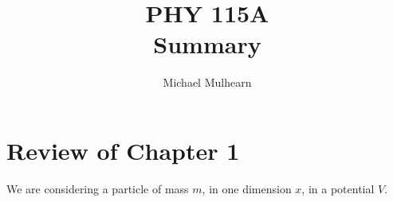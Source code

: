 \documentclass[12pt]{article}
\begin{document}
\newcommand{\ihbar}{\ensuremath{i \hbar}}
\newcommand{\Pss}{\ensuremath{\Psi^*}}
\newcommand{\dPsidt}{\ensuremath{ \frac{\partial \Psi}{\partial t} }}
\newcommand{\dPsidx}{\ensuremath{ \frac{\partial \Psi}{\partial x} }}
\newcommand{\ddPsidx}{\ensuremath{ \frac{\partial^2 \Psi}{\partial x^2} }}
\newcommand{\dPssdt}{\ensuremath{ \frac{\partial \Psi^*}{\partial t} }}
\newcommand{\dPssdx}{\ensuremath{ \frac{\partial \Psi^*}{\partial x} }}
\newcommand{\ddPssdx}{\ensuremath{ \frac{\partial^2 \Psi^*}{\partial x^2} }}

\newcommand{\dphidt}{\ensuremath{ \frac{d \phi}{dt} }}
\newcommand{\dpsidx}{\ensuremath{ \frac{d \psi}{dx} }}
\newcommand{\ddpsidx}{\ensuremath{ \frac{d^2 \psi}{dx^2} }}


\title{PHY 115A \\ Summary\\}
\author{Michael Mulhearn}

\section{Review of Chapter 1}

We are considering a particle of mass $m$, in one dimension $x$, in a potential $V$.
\end{document}
